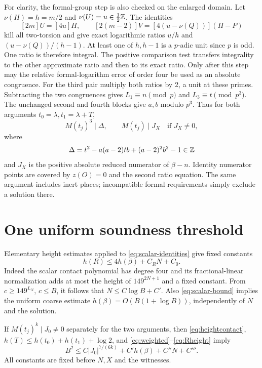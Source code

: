 \documentclass[11pt,a4paper]{article}
\begin{document}
For clarity, the formal-group step is also checked on the enlarged
domain. Let $\nu(H)=h=m/2$ and $\nu(U)=u\in\tfrac12\mathbb Z$.
The identities
\[
 [2m]U=[4u]H,\qquad [2(m-2)]V=[4(u-\nu(Q))](H-P)
\]
kill all two-torsion and give exact logarithmic ratios
$u/h$ and $(u-\nu(Q))/(h-1)$. At least one of $h,h-1$ is a
$p$-adic unit since $p$ is odd. One ratio is therefore integral.
The positive comparison test transfers integrality to the other
approximate ratio and then to its exact ratio. Only after this step
may the relative formal-logarithm error of order four be used as an
absolute congruence. For the third pair multiply both ratios by 2,
a unit at these primes. Subtracting the two congruences gives
$L_1\equiv n\pmod p$ and $L_3\equiv t\pmod {p^3}$.
The unchanged second and fourth blocks give $a,b$ modulo $p^3$.
Thus for both arguments $t_0=\lambda,t_1=\lambda+T$,
\begin{equation}\label{eq:divisibilities}
 M(t_j)^3\mid\Delta,\qquad
 M(t_j)\mid J_X\quad\text{if }J_X\ne0,
\end{equation}
where
\[
 \Delta=t^2-a(a-2)tb+(a-2)^2b^2-1\in\mathbb Z
\]
and $J_X$ is the positive absolute reduced numerator of $\beta-n$.
Identity numerator points are covered by $z(O)=0$ and the second
ratio equation. The same argument includes inert places; incompatible
formal requirements simply exclude a solution there.

\section{One uniform soundness threshold}
Elementary height estimates applied to \eqref{eq:scalar-identities}
give fixed constants
\begin{equation}\label{eq:Rheight}
                     h(R)\le4h(\beta)+C_RN+C_0.
\end{equation}
Indeed the scalar contact polynomial has degree four and its
fractional-linear normalization adds at most the height of
$149^{2N+1}$ and a fixed constant. From
$c\ge149^{L_N}$, $c\le B$, it follows that $N\le C\log B+C'$.
Also \eqref{eq:scalar-bound} implies the uniform coarse estimate
$h(\beta)=O(B(1+\log B))$, independently of $N$ and the solution.

If $M(t_j)^k\mid J_0\ne0$ separately for the two arguments, then
\eqref{eq:heightcontact}, $h(T)\le h(t_0)+h(t_1)+\log2$, and
\eqref{eq:weighted}--\eqref{eq:Rheight} imply
\begin{equation}\label{eq:transfer}
 B^2\le C|J_0|^{7/(6k)}+C'h(\beta)+C''N+C'''.
\end{equation}
All constants are fixed before $N,X$ and the witnesses.
\end{document}
